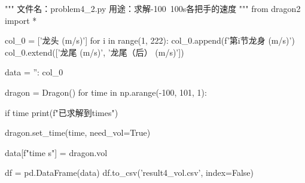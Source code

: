 \documentclass[withoutpreface,bwprint]{cumcmthesis}
\begin{document}
\begin{CodeText}
"""
文件名：problem4_2.py
用途：求解-100~100s各把手的速度
"""
from dragon2 import *


col_0 = ['龙头 (m/s)']
for i in range(1, 222):
      col_0.append(f'第{i}节龙身 (m/s)')
col_0.extend(['龙尾 (m/s)', '龙尾（后） (m/s)'])

data = {'': col_0}

dragon = Dragon()
for time in np.arange(-100, 101, 1):

      if time %
         print(f"已求解到{time}s")

      dragon.set_time(time, need_vol=True)

      data[f"{time} s"] = dragon.vol

df = pd.DataFrame(data)
df.to_csv('result4_vol.csv', index=False)
\end{CodeText}
\end{document}
